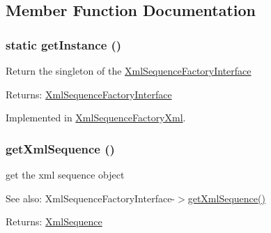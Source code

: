 \subsection{Member Function Documentation}
\hypertarget{interface_xml_sequence_factory_interface_c93fbec81f07e5d15f80db907e63dc10}{
\subsubsection[{getInstance}]{\setlength{\rightskip}{0pt plus 5cm}static getInstance ()}}
\label{interface_xml_sequence_factory_interface_c93fbec81f07e5d15f80db907e63dc10}


Return the singleton of the \hyperlink{interface_xml_sequence_factory_interface}{XmlSequenceFactoryInterface}

\begin{Desc}
\item[Returns:]\hyperlink{interface_xml_sequence_factory_interface}{XmlSequenceFactoryInterface} \end{Desc}


Implemented in \hyperlink{class_xml_sequence_factory_xml_c93fbec81f07e5d15f80db907e63dc10}{XmlSequenceFactoryXml}.\hypertarget{interface_xml_sequence_factory_interface_feb0ab0d5955fcae20ff5062fa59fd79}{
\subsubsection[{getXmlSequence}]{\setlength{\rightskip}{0pt plus 5cm}getXmlSequence ()}}
\label{interface_xml_sequence_factory_interface_feb0ab0d5955fcae20ff5062fa59fd79}


get the xml sequence object

\begin{Desc}
\item[See also:]XmlSequenceFactoryInterface-$>$\hyperlink{interface_xml_sequence_factory_interface_feb0ab0d5955fcae20ff5062fa59fd79}{getXmlSequence()} \end{Desc}
\begin{Desc}
\item[Returns:]\hyperlink{class_xml_sequence}{XmlSequence} \end{Desc}


